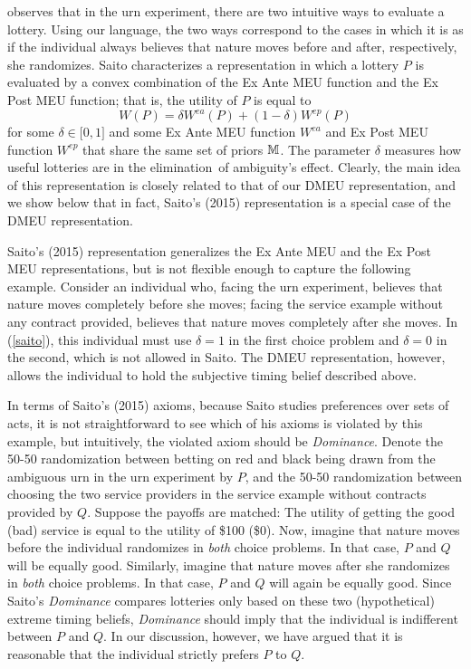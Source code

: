 \documentclass[12pt, notitlepage]{article}
\begin{document}
\label{saito_special}\cite{Saito15} observes that in the urn experiment,
there are two intuitive ways to evaluate a lottery. Using our language, the
two ways correspond to the cases in which it is as if the individual always
believes that nature moves before and after, respectively, she randomizes.
Saito characterizes a representation in which a lottery $P$ is evaluated by
a convex combination of the Ex Ante MEU function and the Ex Post MEU
function; that is, the utility of $P$ is equal to%
\begin{equation}
W(P)=\delta W^{ea}(P)+(1-\delta )W^{ep}(P)  \label{saito}
\end{equation}%
for some $\delta \in \lbrack 0,1]$ and some Ex Ante MEU function $W^{ea}$
and Ex Post MEU function $W^{ep}$ that share the same set of priors $\mathbb{%
M}$. The parameter $\delta $ measures how useful lotteries are in the
elimination\ of ambiguity's effect. Clearly, the main idea of this
representation is closely related to that of our DMEU representation, and we
show below that in fact, Saito's (2015) representation is a special case of
the DMEU representation.

Saito's (2015) representation generalizes the Ex Ante MEU and the Ex Post
MEU representations, but is not flexible enough to capture the following
example. Consider an individual who, facing the urn experiment, believes
that nature moves completely before she moves; facing the service example
without any contract provided, believes that nature moves completely after
she moves. In (\ref{saito}), this individual must use $\delta =1$ in the
first choice problem and $\delta =0$ in the second, which is not allowed in
Saito. The DMEU representation, however, allows the individual to hold the
subjective timing belief described above.

In terms of Saito's (2015) axioms, because Saito studies preferences over
sets of acts, it is not straightforward to see which of his axioms is
violated by this example, but intuitively, the violated axiom should be 
\textit{Dominance}. Denote the 50-50 randomization between betting on red
and black being drawn from the ambiguous urn in the urn experiment by $P$,
and the 50-50 randomization between choosing the two service providers in
the service example without contracts provided by $Q$. Suppose the payoffs
are matched: The utility of getting the good (bad) service is equal to the
utility of \$100 (\$0). Now, imagine that nature moves before the individual
randomizes in \textit{both} choice problems. In that case, $P$ and $Q$ will
be equally good. Similarly, imagine that nature moves after she randomizes
in \textit{both} choice problems. In that case, $P$ and $Q$ will again be
equally good. Since Saito's \textit{Dominance} compares lotteries only based
on these two (hypothetical) extreme timing beliefs, \textit{Dominance}
should imply that the individual is indifferent between $P$ and $Q$. In our
discussion, however, we have argued that it is reasonable that the
individual strictly prefers $P$ to $Q$.
\end{document}
